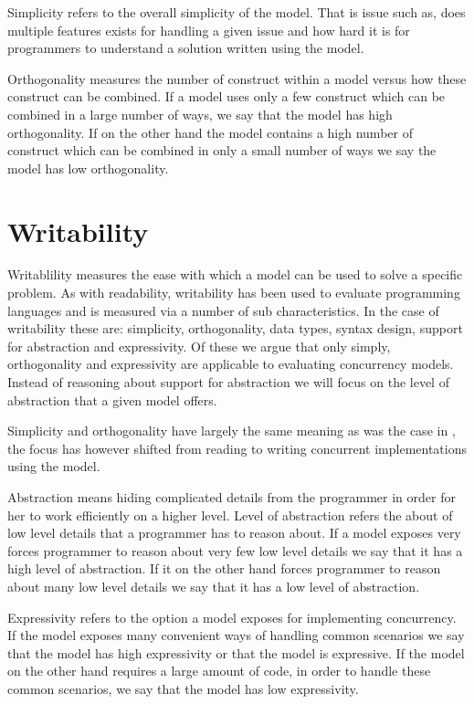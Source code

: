 Simplicity refers to the overall simplicity of the model\cite[p. 8]{sebestaProLang}. That is issue such as, does multiple features exists for handling a given issue and how hard it is for programmers to understand a solution written using the model. 

Orthogonality measures the number of construct within a model versus how these construct can be combined\cite[p. 9]{sebestaProLang}. If a model uses only a few construct which can be combined in a large number of ways, we say that the model has high orthogonality. If on the other hand the model contains a high number of construct which can be combined in only a small number of ways we say the model has low orthogonality.

\section{Writability}
Writablility measures the ease with which a model can be used to solve a specific problem\cite[p. 13]{sebestaProLang}. As with readability, writability has been used to evaluate programming languages and is measured via a number of sub characteristics. In the case of writability these are: simplicity, orthogonality, data types, syntax design, support for abstraction and expressivity. Of these we argue that only simply, orthogonality and expressivity are applicable to evaluating concurrency models. Instead of reasoning about support for abstraction we will focus on the level of abstraction that a given model offers.

Simplicity and orthogonality have largely the same meaning as was the case in , the focus has however shifted from reading to writing concurrent implementations using the model. 

Abstraction means hiding complicated details from the programmer in order for her to work efficiently on a higher level\cite[p. 14]{sebestaProLang}. Level of abstraction refers the about of low level details that a programmer has to reason about. If a model exposes very forces programmer to reason about very few low level details we say that it has a high level of abstraction. If it on the other hand forces programmer to reason about many low level details we say that it has a low level of abstraction.

Expressivity refers to the option a model exposes for implementing concurrency. If the model exposes many convenient ways of handling common scenarios we say that the model has high expressivity or that the model is expressive. If the model on the other hand requires a large amount of code, in order to handle these common scenarios, we say that the model has low expressivity.

